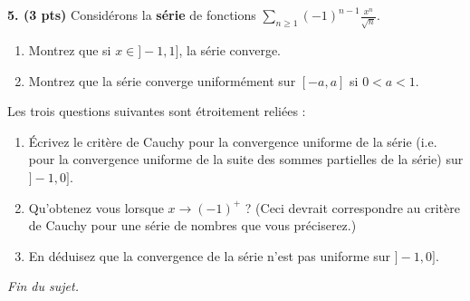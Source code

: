 \documentclass[a4paper,10pt]{article}
\begin{document}
\noindent
\textbf{5. (3 pts)}
Considérons la \textbf{série} de fonctions $\sum_{n\geq1}(-1)^{n-1}\frac{x^n}{\sqrt{n}}$.
\begin{enumerate}[label=\alph*)]
    \item Montrez que si $x\in]-1,1]$, la série converge.
    \item Montrez que la série converge uniformément sur $[-a,a]$ si $0<a<1$.
\end{enumerate}
Les trois questions suivantes sont étroitement reliées :
\begin{enumerate}[resume*]
    \item Écrivez le critère de Cauchy pour la convergence uniforme de la série (i.e. pour la convergence uniforme de la suite des sommes partielles de la série) sur $]-1,0]$.
    \item Qu'obtenez vous lorsque $x\to(-1)^+$ ? (Ceci devrait correspondre au critère de Cauchy pour une série de nombres que vous préciserez.)
    \item En déduisez que la convergence de la série n'est pas uniforme sur $]-1,0]$. \footnotemark
\end{enumerate}


\vspace{.5in}

\centering\emph{Fin du sujet.}
\end{document}
